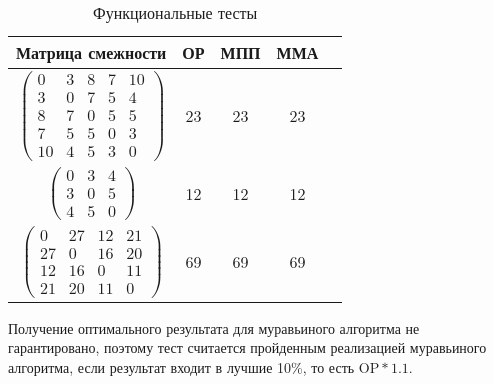 \begin{table}[ht]
    \begin{center}
        \caption{Функциональные тесты}
        \label{tbl:func-tests}
        \begin{tabular}{|c|c|c|c|c|}
            \hline
            Матрица смежности & ОР & МПП & ММА \\
            \hline
            $ \begin{pmatrix}
                0 & 3 & 8 & 7 & 10 \\
                3 & 0 & 7 & 5 & 4 \\
                8 & 7 & 0 & 5 & 5 \\
                7 & 5 & 5 & 0 & 3 \\
                10 & 4 & 5 & 3 & 0 
            \end{pmatrix}$ &
            23 &
            23 & 23 \\
            \hline
            $ \begin{pmatrix}
                0 & 3 & 4 \\
                3 & 0 & 5 \\
                4 & 5 & 0	
            \end{pmatrix}$ &
            12  &
            12 & 12  \\
            \hline
            $ \begin{pmatrix}
                0 & 27 & 12 & 21 \\
                27 & 0 & 16 & 20 \\
                12 & 16 & 0 & 11 \\
                21 & 20 & 11 & 0 
            \end{pmatrix}$ &
            69 &
            69 & 69  \\
            \hline
        \end{tabular}
    \end{center}
    \end{table}

Получение оптимального результата для муравьиного алгоритма не гарантировано, поэтому тест считается пройденным реализацией муравьиного алгоритма, если результат входит в лучшие 10\%, то есть $\text{OP}*1.1$.